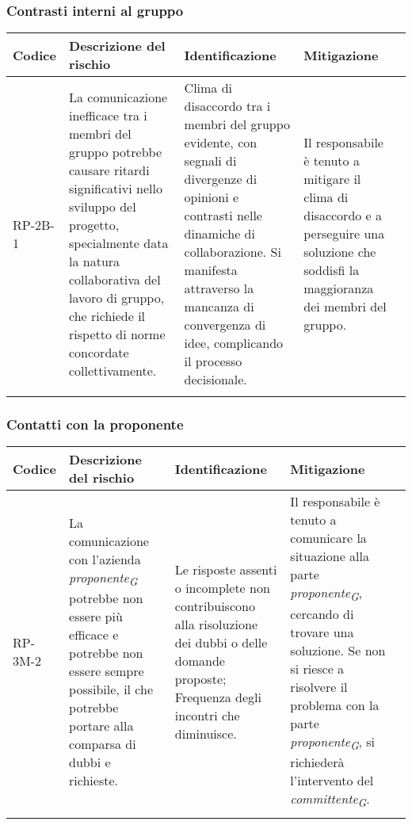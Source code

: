\subsubsection{Contrasti interni al gruppo} \label{subsubsec:contrastiInterni}
\begin{table}[H]
    \centering
    \begin{tabularx}{\textwidth}{l>{\RaggedRight}X>{\RaggedRight}X>{\RaggedRight}X>{\RaggedRight}X}
    \toprule
    \rowcolor{gray!50}
    \textbf{Codice} & \textbf{Descrizione del rischio} & \textbf{Identificazione} & \textbf{Mitigazione} \\
    \midrule
    \addlinespace 
    RP-2B-1 & 
    La comunicazione inefficace tra i membri del gruppo potrebbe causare ritardi significativi nello sviluppo del progetto, specialmente data la natura collaborativa del lavoro di gruppo, che richiede il rispetto di norme concordate collettivamente.& 
    Clima di disaccordo tra i membri del gruppo evidente, con segnali di divergenze di opinioni e contrasti nelle dinamiche di collaborazione. Si manifesta attraverso la mancanza di convergenza di idee, complicando il processo decisionale. &
    Il responsabile è tenuto a mitigare il clima di disaccordo e a perseguire una soluzione che soddisfi la maggioranza dei membri del gruppo.\\
    \bottomrule
    \addlinespace 
    \end{tabularx}
\end{table}

\vspace{2cm}

\subsubsection{Contatti con la proponente} \label{subsubsec:contattiProponente}
\begin{table}[H]
    \centering
    \begin{tabularx}{\textwidth}{l>{\RaggedRight}X>{\RaggedRight}X>{\RaggedRight}X>{\RaggedRight}X}
    \toprule
    \rowcolor{gray!50}
    \textbf{Codice} & \textbf{Descrizione del rischio} & \textbf{Identificazione} & \textbf{Mitigazione} \\
    \midrule
    \addlinespace 
    RP-3M-2 & 
    La comunicazione con l'azienda \textit{proponente}\textsubscript{\textit{G}} potrebbe non essere più efficace e potrebbe non essere sempre possibile, il che potrebbe portare alla comparsa di dubbi e richieste. & Le risposte assenti o incomplete non contribuiscono alla risoluzione dei dubbi o delle domande proposte; Frequenza degli incontri che diminuisce. &
    Il responsabile è tenuto a comunicare la situazione alla parte \textit{proponente}\textsubscript{\textit{G}}, cercando di trovare una soluzione. Se non si riesce a risolvere il problema con la parte \textit{proponente}\textsubscript{\textit{G}}, si richiederà l’intervento del \textit{committente}\textsubscript{\textit{G}}. \\
    \bottomrule
    \addlinespace 
    \end{tabularx}
\end{table}

\pagebreak